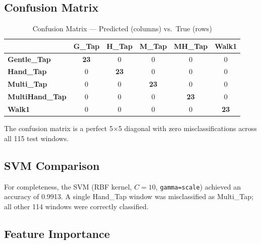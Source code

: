 \documentclass[12pt,a4paper]{report}
\begin{document}
\subsection{Confusion Matrix}

\begin{table}[H]
  \centering
  \caption{Confusion Matrix --- Predicted (columns) vs.\ True (rows)}
  \label{tab:cm}
  \begin{tabular}{l|ccccc}
    \toprule
     & \textbf{G\_Tap} & \textbf{H\_Tap} & \textbf{M\_Tap} & \textbf{MH\_Tap} & \textbf{Walk1} \\
    \midrule
    \textbf{Gentle\_Tap}    & \textbf{23} & 0 & 0 & 0 & 0 \\
    \textbf{Hand\_Tap}      & 0 & \textbf{23} & 0 & 0 & 0 \\
    \textbf{Multi\_Tap}     & 0 & 0 & \textbf{23} & 0 & 0 \\
    \textbf{MultiHand\_Tap} & 0 & 0 & 0 & \textbf{23} & 0 \\
    \textbf{Walk1}          & 0 & 0 & 0 & 0 & \textbf{23} \\
    \bottomrule
  \end{tabular}
\end{table}

The confusion matrix is a perfect 5$\times$5 diagonal with zero
misclassifications across all 115 test windows.

\subsection{SVM Comparison}

For completeness, the SVM (RBF kernel, $C=10$, \texttt{gamma=scale}) achieved
an accuracy of 0.9913. A single Hand\_Tap window was misclassified as
Multi\_Tap; all other 114 windows were correctly classified.

\subsection{Feature Importance}
\end{document}
